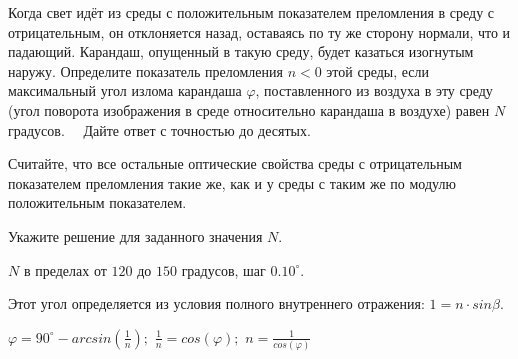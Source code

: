 
Когда свет идёт из среды с положительным показателем преломления в
среду с отрицательным, он отклоняется назад, оставаясь по ту же сторону
нормали, что и падающий. Карандаш, опущенный в такую среду, будет казаться
изогнутым наружу. Определите  показатель преломления $n < 0$
этой среды, если максимальный угол излома карандаша $\varphi$,
поставленного из воздуха в эту среду (угол 
поворота изображения в среде относительно карандаша в воздухе) равен $N$ градусов.   Дайте ответ с точностью до десятых. 

Считайте, что все остальные оптические свойства среды с отрицательным показателем преломления такие же, как и у среды с таким же по модулю положительным показателем.

Укажите решение для заданного значения $N$.

\paramSection

$N$ в пределах от $120$ до $150$ градусов, шаг $0.10^{\circ}$.

\solutionSection

Этот угол определяется из условия полного внутреннего отражения: $1=n \cdot sin\beta$.


$\varphi =90^{\circ}-arcsin(\frac{1}{n});$   $\frac{1}{n}=cos(\varphi );$   $n=\frac{1}{cos(\varphi )}$ 

